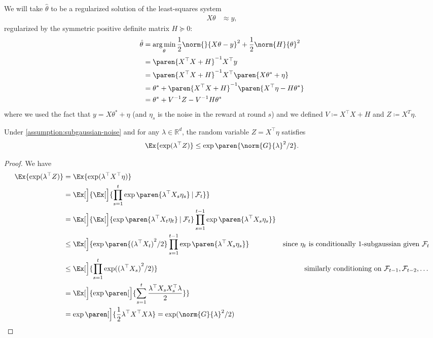 \documentclass{article}
\newcommand{\defeq}{\coloneq}
\newcommand{\inv}[1]{#1^{-1}}
\newcommand{\Real}{\mathds{R}}
\DeclareMathOperator*{\argmin}{arg\,min}
\newcommand\given[1][\delimsize]{%
  \providecommand{\delimsize}{}
  \nonscript\:#1\vert\allowbreak\nonscript\:\mathopen{}
}
\DeclarePairedDelimiter{\paren}()
\newcommand{\transp}[1]{#1^\top}
\begin{document}
We will take $\hat{\theta}$ to be a regularized solution of the
least-squares system
\begin{align*}
  X\theta &\approx y,
\end{align*}
regularized by the symmetric positive definite matrix $H \succeq 0$:
\begin{align*}
  \hat{\theta} &= \argmin_\theta \frac{1}{2}\norm{}{X\theta - y}^2 + \frac{1}{2}\norm{H}{\theta}^2 \\
               &= \inv{\paren{\transp{X}X + H}} \transp{X}y \\
               &= \inv{\paren{\transp{X}X + H}} \transp{X} \paren{X\theta^* + \eta} \\
               &= \theta^* + \inv{\paren{\transp{X}X + H}}\paren{\transp{X}\eta - H\theta^*} \\
               &= \theta^* + \inv{V}Z - \inv{V}H\theta^*
\end{align*}
where we used the fact that $y = X\theta^* + \eta$ (and $\eta_s$ is the
noise in the reward at round $s$) and we defined $V \defeq \transp{X}X
+ H$ and $Z\defeq X^T\eta$.

\begin{lemma}\label{lemma:subgaussian-z}
  Under \cref{assumption:subgaussian-noise} and for any
$\lambda\in\Real^d$, the random variable $Z = \transp{X}\eta$ satisfies
  \begin{align*}
    \Ex{\exp(\transp{\lambda}Z)} \le \exp\paren{\norm{G}{\lambda}^2/2}.
  \end{align*}

  \begin{proof}
    We have
    \begin{align*}
      \Ex{\exp(\transp{\lambda}Z)}
      &= \Ex{\exp(\transp{\lambda}\transp{X}\eta)} \\
      &= \Ex[\Big]{\Ex[\Big]{\prod_{s=1}^t \exp\paren{\transp{\lambda}X_s\eta_s} \given \mathcal{F}_t}} \\
      &= \Ex[\Big]{\Ex[\Big]{\exp\paren{\transp{\lambda}X_t\eta_t} \given \mathcal{F}_t} \prod_{s=1}^{t-1} \exp\paren{\transp{\lambda}X_s\eta_s}} \\
      &\le \Ex[\Big]{\exp\paren{{(\transp{\lambda}X_t)}^2/2}
        \prod_{s=1}^{t-1} \exp\paren{\transp{\lambda}X_s\eta_s}}
      &\text{since $\eta_t$ is conditionally 1-subgaussian given $\mathcal{F}_t$}\\
      &\le \Ex[\Big]{\prod_{s=1}^t\exp({(\transp{\lambda}X_s)}^2/2)}
      &\text{similarly conditioning on $\mathcal{F}_{t-1},\mathcal{F}_{t-2},\dotsc$}\\
      &= \Ex[\Big]{\exp\paren[\Big]{\sum_{s=1}^t\frac{\transp{\lambda}X_s\transp{X_s}\lambda}{2}}} \\
      &= \exp\paren[\Big]{\frac{1}{2}\transp{\lambda}\transp{X}X\lambda}
        = \exp(\norm{G}{\lambda}^2/2)
        \qedhere
    \end{align*}
  \end{proof}
\end{lemma}
\end{document}
